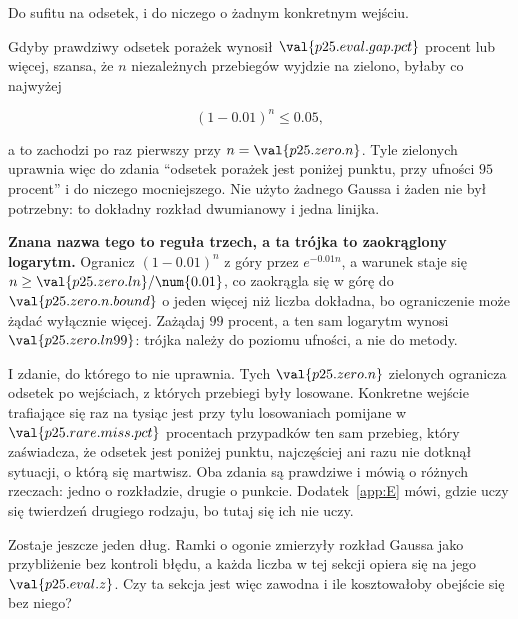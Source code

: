 \begin{fr}
\begin{ansblock}
Do sufitu na odsetek, i do niczego o żadnym konkretnym wejściu.
\end{ansblock}

Gdyby prawdziwy odsetek porażek wynosił $\val{p25.eval.gap.pct}$ procent lub
więcej, szansa, że $n$ niezależnych przebiegów wyjdzie na zielono, byłaby co
najwyżej

\[ (1 - \num{0.01})^{n} \le \num{0.05}, \]

a to zachodzi po raz pierwszy przy $n = \val{p25.zero.n}$. Tyle zielonych
uprawnia więc do zdania \enquote{odsetek porażek jest poniżej punktu, przy
ufności $95$ procent} i do niczego mocniejszego. Nie użyto żadnego Gaussa i żaden
nie był potrzebny: to dokładny rozkład dwumianowy i jedna linijka.

\textbf{Znana nazwa tego to reguła trzech, a ta trójka to zaokrąglony
logarytm.} Ogranicz $(1 - \num{0.01})^{n}$ z góry przez
$e^{-\num{0.01}n}$, a warunek staje się $n \ge \val{p25.zero.ln}/\num{0.01}$,
co zaokrągla się w górę do $\val{p25.zero.n.bound}$ \dash{} o jeden więcej niż
liczba dokładna, bo ograniczenie może żądać wyłącznie więcej. Zażądaj $99$
procent, a ten sam logarytm wynosi $\val{p25.zero.ln99}$: trójka należy do
poziomu ufności, a nie do metody.

I zdanie, do którego to nie uprawnia. Tych $\val{p25.zero.n}$ zielonych ogranicza
odsetek po wejściach, z których przebiegi były losowane. Konkretne wejście
trafiające się raz na tysiąc jest przy tylu losowaniach pomijane w
$\val{p25.rare.miss.pct}$ procentach przypadków \dash{} ten sam przebieg,
który zaświadcza, że odsetek jest poniżej punktu, najczęściej ani razu nie
dotknął sytuacji, o którą się martwisz. Oba
zdania są prawdziwe i mówią o różnych rzeczach: jedno o rozkładzie, drugie o
punkcie. Dodatek~\ref{app:E} mówi, gdzie uczy się twierdzeń drugiego rodzaju,
bo tutaj się ich nie uczy.

Zostaje jeszcze jeden dług. Ramki o ogonie zmierzyły rozkład Gaussa jako
przybliżenie bez kontroli błędu, a każda liczba w tej sekcji opiera się na
jego $\val{p25.eval.z}$. Czy ta sekcja jest więc zawodna \dash{} i ile
kosztowałoby obejście się bez niego?
\dotline
\nextframe
\end{fr}

